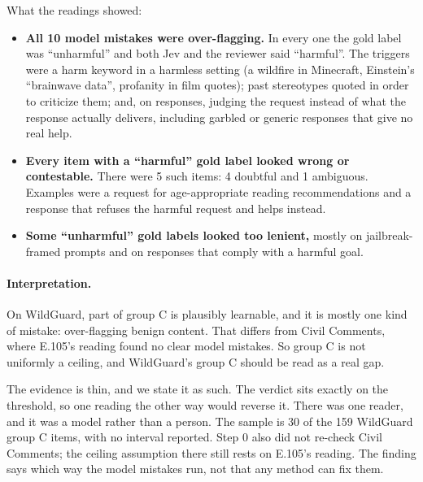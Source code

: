 \documentclass[11pt]{article}
\renewcommand{\_}{\origunderscore\allowbreak}
\begin{document}
What the readings showed:
\begin{itemize}[leftmargin=*]
\item \textbf{All 10 model mistakes were over-flagging.} In every one the gold label was ``unharmful'' and both Jev and the reviewer said ``harmful''. The triggers were a harm keyword in a harmless setting (a wildfire in Minecraft, Einstein's ``brainwave data'', profanity in film quotes); past stereotypes quoted in order to criticize them; and, on responses, judging the request instead of what the response actually delivers, including garbled or generic responses that give no real help.
\item \textbf{Every item with a ``harmful'' gold label looked wrong or contestable.} There were 5 such items: 4 doubtful and 1 ambiguous. Examples were a request for age-appropriate reading recommendations and a response that refuses the harmful request and helps instead.
\item \textbf{Some ``unharmful'' gold labels looked too lenient,} mostly on jailbreak-framed prompts and on responses that comply with a harmful goal.
\end{itemize}

\paragraph{Interpretation.}
On WildGuard, part of group C is plausibly learnable, and it is mostly one kind of mistake: over-flagging benign content. That differs from Civil Comments, where E.105's reading found no clear model mistakes. So group C is not uniformly a ceiling, and WildGuard's group C should be read as a real gap.

The evidence is thin, and we state it as such. The verdict sits exactly on the threshold, so one reading the other way would reverse it. There was one reader, and it was a model rather than a person. The sample is 30 of the 159 WildGuard group C items, with no interval reported. Step 0 also did not re-check Civil Comments; the ceiling assumption there still rests on E.105's reading. The finding says which way the model mistakes run, not that any method can fix them.
\end{document}
